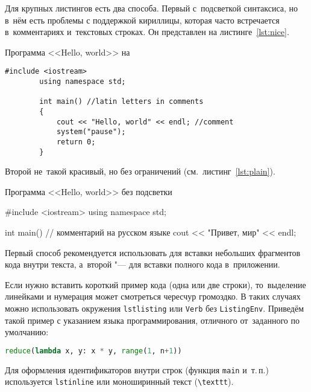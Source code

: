 Для крупных листингов есть два способа. Первый с~подсветкой синтаксиса, 
но в~нём есть проблемы с поддержкой кириллицы, которая часто встречается 
в~комментариях и~текстовых строках. Он представлен на 
листинге~\ref{lst:nice}.
\begin{ListingEnv}[!h]%
    \captiondelim{ } %
    \caption{Программа <<Hello, world>> на \protect\cpp}\label{lst:nice}
    \begin{lstlisting}[language={[ISO]C++}]
        #include <iostream>
        using namespace std;

        int main() //latin letters in comments
        {
            cout << "Hello, world" << endl; //comment
            system("pause");
            return 0;
        }
    \end{lstlisting}
\end{ListingEnv}%
Второй не~такой красивый, но без ограничений (см.~листинг~\ref{lst:plain}).
\begin{ListingEnv}[!h]
    \captiondelim{ } %
    \caption{Программа <<Hello, world>> без подсветки}\label{lst:plain}
    \begin{Verb}
        #include <iostream>
        using namespace std;

        int main() // комментарий на русском языке
        {
            cout << "Привет, мир" << endl;
        }
    \end{Verb}
\end{ListingEnv}

Первый способ рекомендуется использовать для вставки небольших фрагментов
кода внутри текста, а~второй "--- для вставки полного кода в~приложении.

Если нужно вставить короткий пример кода (одна или две строки),
то~выделение  линейками и нумерация может смотреться чересчур громоздко.
В таких случаях можно использовать окружения \texttt{lstlisting} или
\texttt{Verb} без \texttt{ListingEnv}. Приведём такой пример
с указанием языка программирования, отличного от~заданного по умолчанию:
\begin{lstlisting}[language=Python]
    reduce(lambda x, y: x * y, range(1, n+1))
\end{lstlisting}

Для оформления идентификаторов внутри строк
(функция \lstinline{main} и~т.\,п.) используется
\texttt{lstinline} или моноширинный текст
(\texttt{\textbackslash texttt}).

